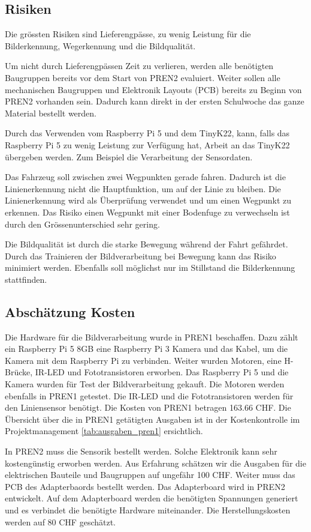 \documentclass[../main.tex]{subfiles}
\begin{document}
\newpage
\subsection{Risiken}
Die grössten Risiken sind Lieferengpässe, zu wenig Leistung für die Bilderkennung, Wegerkennung und die Bildqualität. 

Um nicht durch Lieferengpässen Zeit zu verlieren, werden alle benötigten Baugruppen bereits vor dem Start von PREN2 evaluiert. Weiter sollen alle mechanischen Baugruppen und Elektronik Layouts (PCB) bereits zu Beginn von PREN2 vorhanden sein. Dadurch kann direkt in der ersten Schulwoche das ganze Material bestellt werden.

Durch das Verwenden vom Raspberry Pi 5 und dem TinyK22, kann, falls das Raspberry Pi 5 zu wenig Leistung zur Verfügung hat, Arbeit an das TinyK22 übergeben werden. Zum Beispiel die Verarbeitung der Sensordaten. 

Das Fahrzeug soll zwischen zwei Wegpunkten gerade fahren. Dadurch ist die Linienerkennung nicht die Hauptfunktion, um auf der Linie zu bleiben. Die Linienerkennung wird als Überprüfung verwendet und um einen Wegpunkt zu erkennen. Das Risiko einen Wegpunkt mit einer Bodenfuge zu verwechseln ist durch den Grössenunterschied sehr gering. 

Die Bildqualität ist durch die starke Bewegung während der Fahrt gefährdet. Durch das Trainieren der Bildverarbeitung bei Bewegung kann das Risiko minimiert werden. Ebenfalls soll möglichst nur im Stillstand die Bilderkennung stattfinden. 

\subsection{Abschätzung Kosten}
Die Hardware für die Bildverarbeitung wurde in PREN1 beschaffen. Dazu zählt ein Raspberry Pi 5 8GB eine Raspberry Pi 3 Kamera und das Kabel, um die Kamera mit dem Raspberry Pi zu verbinden. Weiter wurden Motoren, eine H-Brücke, IR-LED und Fototransistoren erworben. Das Raspberry Pi 5 und die Kamera wurden für Test der Bildverarbeitung gekauft. Die Motoren werden ebenfalls in PREN1 getestet. Die IR-LED und die Fototransistoren werden für den Liniensensor benötigt. Die Kosten von PREN1 betragen 163.66 CHF. Die Übersicht über die in PREN1 getätigten Ausgaben ist in der Kostenkontrolle im Projektmanagement \ref{tab:ausgaben_pren1} ersichtlich. 

In PREN2 muss die Sensorik bestellt werden. Solche Elektronik kann sehr kostengünstig erworben werden. Aus Erfahrung schätzen wir die Ausgaben für die elektrischen Bauteile und Baugruppen auf ungefähr 100 CHF. Weiter muss das PCB des Adapterbaords bestellt werden. Das Adapterboard wird in PREN2 entwickelt. Auf dem Adapterboard werden die benötigten Spannungen generiert und es verbindet die benötigte Hardware miteinander. Die Herstellungskosten werden auf 80 CHF geschätzt.
\end{document}
